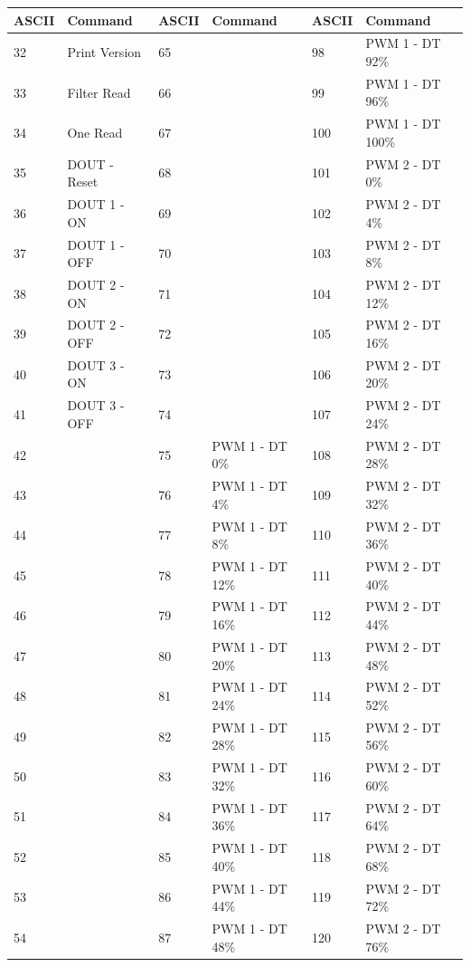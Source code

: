 	\begin{table}[h!]
		\begin{tabular}{|l|l|l|l|l|l|}
		\hline
		\textbf{ASCII} & \textbf{Command} & \textbf{ASCII} & \textbf{Command} & \textbf{ASCII} & \textbf{Command} \\ \hline
		32 & Print Version & 65 &  & 98 & PWM 1 - DT 92\% \\ \hline
		33 & Filter Read & 66 &  & 99 & PWM 1 - DT 96\% \\ \hline
		34 & One Read & 67 &  & 100 & PWM 1 - DT 100\% \\ \hline
		35 & DOUT - Reset & 68 &  & 101 & PWM 2 - DT 0\% \\ \hline
		36 & DOUT 1 - ON & 69 &  & 102 & PWM 2 - DT 4\% \\ \hline
		37 & DOUT 1 - OFF & 70 &  & 103 & PWM 2 - DT 8\% \\ \hline
		38 & DOUT 2 - ON & 71 &  & 104 & PWM 2 - DT 12\% \\ \hline
		39 & DOUT 2 - OFF & 72 &  & 105 & PWM 2 - DT 16\% \\ \hline
		40 & DOUT 3 - ON & 73 &  & 106 & PWM 2 - DT 20\% \\ \hline
		41 & DOUT 3 - OFF & 74 &  & 107 & PWM 2 - DT 24\% \\ \hline
		42 &  & 75 & PWM 1 - DT 0\% & 108 & PWM 2 - DT 28\% \\ \hline
		43 &  & 76 & PWM 1 - DT 4\% & 109 & PWM 2 - DT 32\% \\ \hline
		44 &  & 77 & PWM 1 - DT 8\% & 110 & PWM 2 - DT 36\% \\ \hline
		45 &  & 78 & PWM 1 - DT 12\% & 111 & PWM 2 - DT 40\% \\ \hline
		46 &  & 79 & PWM 1 - DT 16\% & 112 & PWM 2 - DT 44\% \\ \hline
		47 &  & 80 & PWM 1 - DT 20\% & 113 & PWM 2 - DT 48\% \\ \hline
		48 &  & 81 & PWM 1 - DT 24\% & 114 & PWM 2 - DT 52\% \\ \hline
		49 &  & 82 & PWM 1 - DT 28\% & 115 & PWM 2 - DT 56\% \\ \hline
		50 &  & 83 & PWM 1 - DT 32\% & 116 & PWM 2 - DT 60\% \\ \hline
		51 &  & 84 & PWM 1 - DT 36\% & 117 & PWM 2 - DT 64\% \\ \hline
		52 &  & 85 & PWM 1 - DT 40\% & 118 & PWM 2 - DT 68\% \\ \hline
		53 &  & 86 & PWM 1 - DT 44\% & 119 & PWM 2 - DT 72\% \\ \hline
		54 &  & 87 & PWM 1 - DT 48\% & 120 & PWM 2 - DT 76\% \\ \hline

\end{tabular}
\end{table}
